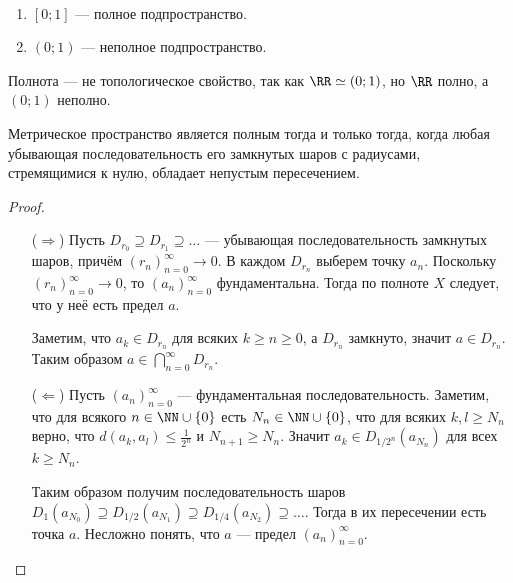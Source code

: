 \documentclass[12pt,a4paper]{article}
\begin{document}
    \begin{example}\ 
        \begin{enumerate}
            \item $[0;1]$ --- полное подпространство.
            \item $(0;1)$ --- неполное подпространство.
        \end{enumerate}
    \end{example}

    \begin{corollary}
        Полнота --- не топологическое свойство, так как $\RR \simeq (0; 1)$, но $\RR$ полно, а $(0; 1)$ неполно.
    \end{corollary}

    \begin{theorem}
        Метрическое пространство является полным тогда и только тогда, когда любая убывающая последовательность его замкнутых шаров с радиусами, стремящимися к нулю, обладает непустым пересечением.
    \end{theorem}

    \begin{proof}\ 
        \begin{itemize}
            \item[($\Rightarrow$)] Пусть $D_{r_0} \supseteq D_{r_1} \supseteq \dots$ --- убывающая последовательность замкнутых шаров, причём $(r_n)_{n=0}^\infty \to 0$. В каждом $D_{r_n}$ выберем точку $a_n$. Поскольку $(r_n)_{n=0}^\infty \to 0$, то $(a_n)_{n=0}^\infty$ фундаментальна. Тогда по полноте $X$ следует, что у неё есть предел $a$.
            
            Заметим, что $a_k \in D_{r_n}$ для всяких $k \geqslant n \geqslant 0$, а $D_{r_n}$ замкнуто, значит $a \in D_{r_n}$. Таким образом $a \in \bigcap_{n=0}^\infty D_{r_n}$.

            \item[($\Leftarrow$)] Пусть $(a_n)_{n=0}^\infty$ --- фундаментальная последовательность. Заметим, что для всякого $n \in \NN \cup \{0\}$ есть $N_n \in \NN \cup \{0\}$, что для всяких $k, l \geqslant N_n$ верно, что $d(a_k, a_l) \leqslant \frac{1}{2^n}$ и $N_{n+1} \geqslant N_n$. Значит $a_k \in D_{1/2^n}(a_{N_n})$ для всех $k \geqslant N_n$.
            
            Таким образом получим последовательность шаров $D_{1}(a_{N_0}) \supseteq D_{1/2}(a_{N_1}) \supseteq D_{1/4}(a_{N_2}) \supseteq \dots$. Тогда в их пересечении есть точка $a$. Несложно понять, что $a$ --- предел $(a_n)_{n=0}^\infty$.
        \end{itemize}
    \end{proof}
\end{document}
